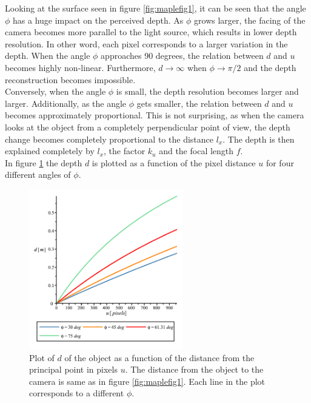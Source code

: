 Looking at the surface seen in figure \ref{fig:maplefig1}, it can be seen that the angle $\phi$ has a huge impact on the perceived depth. As $\phi$ grows larger, the facing of the camera becomes more parallel to the light source, which results in lower depth resolution. In other word, each pixel corresponds to a larger variation in the depth. When the angle $\phi$ approaches 90 degrees, the relation between $d$ and $u$ becomes highly non-linear. Furthermore, $d \rightarrow \infty$ when $\phi \rightarrow \pi/2$ and the depth reconstruction becomes impossible.\\ 

Conversely, when the angle $\phi$ is small, the depth resolution becomes larger and larger. Additionally, as the angle $\phi$ gets smaller, the relation between $d$ and $u$ becomes approximately proportional. This is not surprising, as when the camera looks at the object from a completely perpendicular point of view, the depth change becomes completely proportional to the distance $l_{x}$. The depth is then explained completely by $l_{x}$, the factor $k_{u}$ and the focal length $f$.\\

In figure \ref{fig:maplefig2} the depth $d$ is plotted as a function of the pixel distance $u$ for four different angles of $\phi$.

\begin{figure}[H]
    \centering
    \includegraphics[width=0.6\textwidth]{figures/reconstruction/maplefig2_crop.pdf}
    \caption{Plot of $d$ of the object as a function of the distance from the principal point in pixels $u$. The distance from the object to the camera is same as in figure \ref{fig:maplefig1}. Each line in the plot corresponds to a different $\phi$.}
    \label{fig:maplefig2}
\end{figure}

